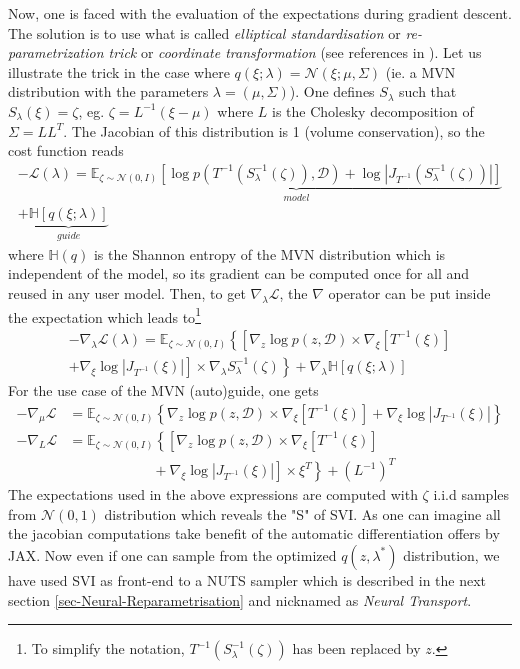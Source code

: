 \documentclass[twocolumn,twocolappendix,nofootinbib,iop]{openjournal}
\newcommand{\nn}{\nonumber}
\begin{document}
Now, one is faced with the evaluation of the expectations during gradient descent. The solution is to use what is called \textit{elliptical standardisation} or \textit{re-parametrization trick} or \textit{coordinate transformation} (see references in \citep{2015arXiv150603431K}). Let us illustrate the trick in the case where $q(\xi; \lambda) = \mathcal{N}(\xi; \mu, \Sigma)$ (ie. a MVN distribution with the parameters $\lambda=(\mu, \Sigma)$). One defines $S_\lambda$ such that $S_\lambda(\xi)=\zeta$, eg. $\zeta = L^{-1}(\xi-\mu)$ where $L$ is the Cholesky decomposition of $\Sigma=LL^T$. The Jacobian of this distribution is 1 (volume conservation), so the cost function reads
\begin{multline}
-\mathcal{L}(\lambda) = \underbrace{\mathbb{E}_{\zeta\sim \mathcal{N}(0,I)}\left[ \log p(T^{-1}(S_\lambda^{-1}(\zeta)),\mathcal{D}) + \log |J_{T^{-1}}(S_\lambda^{-1}(\zeta))| \right]}_{model} \\ + \underbrace{\mathbb{H}[q(\xi;\lambda)]}_{guide}
\label{eq-loss-svi-3}
\end{multline}
where $\mathbb{H}(q)$ is the Shannon entropy of the MVN distribution which is independent of the model, so its gradient can be computed once for all and reused in any user model. Then,
to get $\nabla_\lambda \mathcal{L}$, the $\nabla$ operator can be put inside the expectation which leads to\footnote{To simplify the notation, $T^{-1}(S_\lambda^{-1}(\zeta))$ has been replaced by $z$.}
\begin{multline}
-\nabla_\lambda\mathcal{L}(\lambda) = \mathbb{E}_{\zeta\sim \mathcal{N}(0,I)}\left\{
\left[ \nabla_z \log p(z,\mathcal{D}) \times \nabla_\xi[T^{-1}(\xi)] \right. \right. \\
+ \left. \left. \nabla_\xi \log|J_{T^{-1}}(\xi)| \right] \times \nabla_\lambda S_\lambda^{-1}(\zeta)
\right\}
+ \nabla_\lambda \mathbb{H}[q(\xi;\lambda)]
\label{eq-loss-svi-4}
\end{multline}
For the use case of the MVN (auto)guide, one gets
\begin{align}
-\nabla_\mu \mathcal{L} &= \mathbb{E}_{\zeta\sim \mathcal{N}(0,I)}\left\{
\nabla_z \log p(z,\mathcal{D}) \times \nabla_\xi[T^{-1}(\xi)]
+ \nabla_\xi \log|J_{T^{-1}}(\xi)|
\right\} \nn \\
-\nabla_L \mathcal{L} &= \mathbb{E}_{\zeta\sim \mathcal{N}(0,I)}\left\{
\left[ \nabla_z \log p(z,\mathcal{D}) \times \nabla_\xi[T^{-1}(\xi)] \right.\right. \nn\\
&\left. \left. \qquad\qquad\qquad + \nabla_\xi \log|J_{T^{-1}}(\xi)| \right] \times \xi^T 
\right\}+ (L^{-1})^T
\end{align}
The expectations used in the above expressions are computed with $\zeta$ i.i.d samples from $\mathcal{N}(0,1)$ distribution which reveals the "S" of SVI. As one can imagine all the jacobian computations take benefit of the automatic differentiation offers by JAX. Now even if one can sample from the optimized  $q(z,\lambda^\ast)$ distribution, we have used SVI as front-end to a NUTS sampler which is described in the next section \ref{sec-Neural-Reparametrisation} and nicknamed as \textit{Neural Transport}.
%
\end{document}
